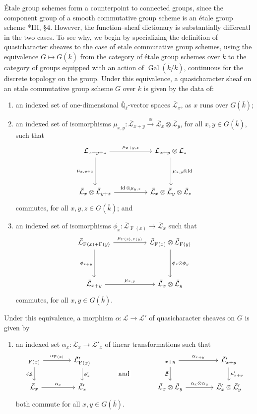 \documentclass{amsart}
\makeatletter
\theoremstyle{plain}
\theoremstyle{definition}
\theoremstyle{remark}
\newcommand{\EE}{\mathbb{\bar Q}_\ell}
\newcommand{\bFq}{\bar{k}}
\newcommand{\Fq}{k}
\DeclareMathOperator{\Gal}{Gal}
\newcommand{\Frob}[1]{\operatorname{F}_{#1}}
\DeclareMathOperator{\id}{id}
\newcommand{\iso}{{\ \cong\ }}
\newcommand{\qcs}[1]{{\mathcal{#1}}}
\newcommand{\gqcs}[1]{{\mathcal{\bar #1}}}
\newcommand{\labitem}[2]{
\def\@itemlabel{\textbf{#1}}
\item
\def\@currentlabel{#1}\label{#2}}
\newcommand{\tight}[3]{\hspace{-#1pt}{#2}\hspace{-#3pt}}
\makeatother
\begin{document}
\'Etale group schemes form a counterpoint to connected groups,
since the component group of a smooth commutative group scheme
is an \'etale group scheme \cite{vdGeer-Moonen:AbelianVarieties}*{III, \S 4}.
However, the function--sheaf dictionary is substantially differentl in the two cases.
To see why, we begin by specializing the definition of quasicharacter sheaves to the case
of etale commutative group schemes,
using the equivalence $G \mapsto G(\bFq)$
from the category of \'etale group schemes over $\Fq$ to the category of groups equipped
with an action of $\Gal(\bFq/\Fq)$, continuous for the discrete topology on the group.
Under this equivalence, a quasicharacter sheaf on an etale commutative group scheme $G$ over $\Fq$ is given by the data of:
\begin{enumerate}
 \labitem{(qc.1)}{qc.1} an indexed set of one-dimensional
  $\EE$-vector spaces $\gqcs{L}_x$, as $x$ runs over
  $G(\bFq)$;

 \labitem{(qc.2)}{qc.2} an indexed set of isomorphisms
  $\mu_{x,y} : \gqcs{L}_{x+y} \xrightarrow{\iso} \gqcs{L}_{x} \otimes\gqcs{L}_{y}$,
  for all $x,y \in G(\bFq)$, such that
  \[
   \begin{tikzcd}[row sep=40]
    \gqcs{L}_{x+y+z} \arrow{rr}{\mu_{x+y,z}} \arrow[swap]{d}{\mu_{x,y+z}}
    && \gqcs{L}_{x+y}\otimes\gqcs{L}_{z} \dar{\mu_{x,y} \tight{0.5}{\otimes}{1} \id} \\
    \gqcs{L}_{x} \otimes\gqcs{L}_{y+z} \arrow{rr}{\id \otimes\mu_{y,z}}
    && \gqcs{L}_{x} \otimes\gqcs{L}_{y} \otimes\gqcs{L}_{z}
   \end{tikzcd}
  \]
  commutes, for all $x,y,z\in G(\bFq)$; and
 \labitem{(qc.3)}{qc.3} an indexed set of isomorphisms $\phi_{x} : \gqcs{L}_{\Frob{}(x)} \to \gqcs{L}_x$
  such that
  \[
   \begin{tikzcd}[row sep=40]
    \gqcs{L}_{\Frob{}(x)+\Frob{}(y)} \arrow[swap]{d}{\phi_{x+y}} \arrow{rr}{\mu_{\Frob{}(x),\Frob{}(y)}}
    && \gqcs{L}_{\Frob{}(x)}\otimes\gqcs{L}_{\Frob{}(y)} \dar{\phi_x \tight{0}{\otimes}{0} \phi_y} \\
    \gqcs{L}_{x+y} \arrow{rr}{\mu_{x,y}}
    && \gqcs{L}_x \otimes\gqcs{L}_y
   \end{tikzcd}
  \]
  commutes, for all $x,y\in G(\bFq)$.
\end{enumerate}
Under this equivalence, a morphism $\alpha : \qcs{L} \to \qcs{L'}$ of quasicharacter sheaves on $G$ is given by
\begin{enumerate}
 \labitem{(qc.4)}{qc.4} an indexed set $\alpha_x : \gqcs{L}_x \to \gqcs{L'}_x$
  of linear transformations such that
  \[
   \begin{tikzcd}[column sep=40]
    \arrow[swap]{d}{\phi_x} \gqcs{L}_{\Frob{}(x)} \rar{\alpha_{\Frob{}(x)}} & \gqcs{L'}_{\Frob{}(x)} \dar{\phi_x'}
    &\arrow[draw=none]{d}[pos=.4,description]{\text{\normalsize{and}}}
    & \arrow[swap]{d}{\mu} \gqcs{L}_{x+y} \rar{\alpha_{x+y}} & \gqcs{L'}_{x+y} \dar{\mu'_{x+y}} \\
    \gqcs{L}_x \rar{\alpha_x} & \gqcs{L'}_x
    & {} & \gqcs{L}_x\otimes\gqcs{L}_y \rar{\alpha_x\otimes\alpha_y} & \gqcs{L'}_x \otimes\gqcs{L'}_y
   \end{tikzcd}
  \]
  both commute for all $x, y \in G(\bFq)$.
\end{enumerate}
\end{document}
